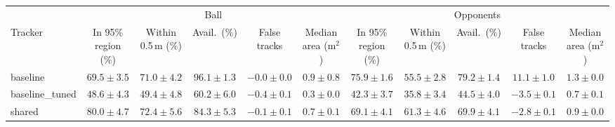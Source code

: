 \begin{tabular}{lcccccccccc}
\toprule
 & \multicolumn{5}{c}{Ball} & \multicolumn{5}{c}{Opponents} \\
\cmidrule(lr){2-6}\cmidrule(lr){7-11}
Tracker & In 95\% region (\%) & Within 0.5\,m (\%) & Avail.\ (\%) & False tracks & Median area (m$^2$) & In 95\% region (\%) & Within 0.5\,m (\%) & Avail.\ (\%) & False tracks & Median area (m$^2$) \\
\midrule
baseline & $69.5 \pm 3.5$ & $71.0 \pm 4.2$ & $96.1 \pm 1.3$ & $-0.0 \pm 0.0$ & $0.9 \pm 0.8$ & $75.9 \pm 1.6$ & $55.5 \pm 2.8$ & $79.2 \pm 1.4$ & $11.1 \pm 1.0$ & $1.3 \pm 0.0$ \\
baseline\_tuned & $48.6 \pm 4.3$ & $49.4 \pm 4.8$ & $60.2 \pm 6.0$ & $-0.4 \pm 0.1$ & $0.3 \pm 0.0$ & $42.3 \pm 3.7$ & $35.8 \pm 3.4$ & $44.5 \pm 4.0$ & $-3.5 \pm 0.1$ & $0.7 \pm 0.1$ \\
shared & $80.0 \pm 4.7$ & $72.4 \pm 5.6$ & $84.3 \pm 5.3$ & $-0.1 \pm 0.1$ & $0.7 \pm 0.1$ & $69.1 \pm 4.1$ & $61.3 \pm 4.6$ & $69.9 \pm 4.1$ & $-2.8 \pm 0.1$ & $0.9 \pm 0.0$ \\
\bottomrule
\end{tabular}
